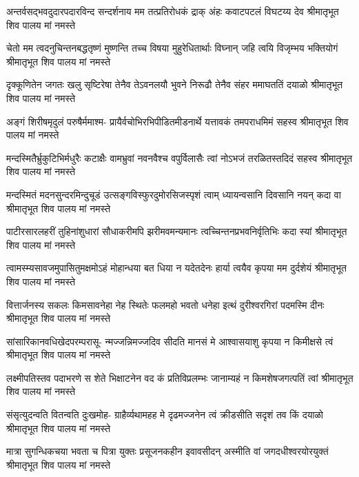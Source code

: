 \fourlineindentedshloka
{अन्तर्वसद्भवदुदारपदारविन्द}
{सन्दर्शनाय मम तत्प्रतिरोधकं द्राक्}
{अंहः कवाटपटलं विघटय्य देव}
{श्रीमातृभूत शिव पालय मां नमस्ते} %

\fourlineindentedshloka
{चेतो मम त्वदनुचिन्तनबद्धतृष्णं}
{मुष्णन्ति तच्च विषया मुहुरेधितार्थाः}
{विघ्नान् जहि त्वयि विजृम्भय भक्तियोगं}
{श्रीमातृभूत शिव पालय मां नमस्ते} %

\fourlineindentedshloka
{दृक्कूणितेन जगतः खलु सृष्टिरेषा}
{तेनैव तेऽवनलयौ भुवने निरूढौ}
{तेनैव संहर ममाघततिं दयाळो}
{श्रीमातृभूत शिव पालय मां नमस्ते} %

\fourlineindentedshloka
{अङ्गं शिरीषमृदुलं परुषैर्ममाश्म-}
{प्रायैर्वचोभिरभिपीडितमीडनार्थे}
{यत्तावकं तमपराधमिमं सहस्व}
{श्रीमातृभूत शिव पालय मां नमस्ते} %

\fourlineindentedshloka
{मन्दस्मितैर्भ्रुकुटिभिर्मधुरैः कटाक्षैः}
{वामभ्रुवां नवनवैश्च वपुर्विलासैः}
{त्वां नोऽभजं तरळितस्तदिदं सहस्व}
{श्रीमातृभूत शिव पालय मां नमस्ते} %

\fourlineindentedshloka
{मन्दस्मितं मदनसुन्दरमिन्दुचूडं}
{उत्सङ्गविस्फुरदुमोरसिजस्पृशं त्वाम्}
{ध्यायन्वसानि दिवसानि नयन् कदा वा}
{श्रीमातृभूत शिव पालय मां नमस्ते} %

\fourlineindentedshloka
{पाटीरसारलहरीं तुहिनांशुधारां}
{सौधाकरीमपि झरीमवमन्यमानः}
{त्वच्चिन्तनप्रभवनिर्वृतिभिः कदा स्यां}
{श्रीमातृभूत शिव पालय मां नमस्ते} %

\fourlineindentedshloka
{त्वामस्म्यसावजमुपासितुमक्षमोऽहं}
{मोहान्धया बत धिया न यदेतदेनः}
{हार्या त्वयैव कृपया मम दुर्दशेयं}
{श्रीमातृभूत शिव पालय मां नमस्ते} %

\fourlineindentedshloka
{वित्तार्जनस्य सकलः किमसावनेहा}
{नेह स्थितेः फलमहो भवतो धनेहा}
{ इत्थं दुरीश्वरगिरां पदमस्मि दीनः}
{श्रीमातृभूत शिव पालय मां नमस्ते} %

\fourlineindentedshloka
{सांसारिकानवधिखेदपरम्परासू-}
{न्मज्जन्निमज्जदिव सीदति मानसं मे}
{आश्वासयाशु कृपया न किमीक्षसे त्वं}
{श्रीमातृभूत शिव पालय मां नमस्ते} %

\fourlineindentedshloka
{लक्ष्मीपतिस्तव पदाभरणे स शेते}
{भिक्षाटनेन वद कं प्रतिविप्रलम्भः}
{जानाम्यहं न किमशेषजगत्पतिं त्वां}
{श्रीमातृभूत शिव पालय मां नमस्ते} %

\fourlineindentedshloka
{संसृत्युदन्वति वितन्वति दुःखमोह-}
{ग्राहैर्व्यथामहह मे दृढमज्जनेन}
{त्वं क्रीडसीति सदृशं तव किं दयाळो}
{श्रीमातृभूत शिव पालय मां नमस्ते} %

\fourlineindentedshloka
{मात्रा सुगन्धिकचया भवता च पित्रा}
{युक्तः प्रसूजनकहीन इवावसीदन्}
{अस्मीति वां जगदधीश्वरयोरयुक्तं}
{श्रीमातृभूत शिव पालय मां नमस्ते} %


